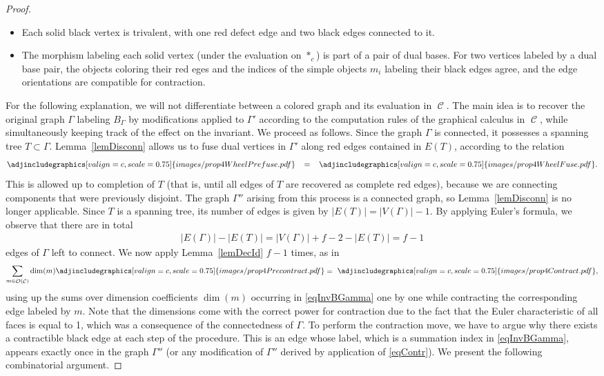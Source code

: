 \documentclass[10pt,a4paper]{amsart}
\DeclareMathOperator{\calc}{\mathcal{C}}
\DeclareMathOperator{\calo}{\mathcal{O}}
\numberwithin{equation}{section}
\theoremstyle{definition}
\begin{document}
\begin{proof}
 \begin{itemize}\itemsep=0pt
 \item Each solid black vertex is trivalent, with one red defect edge and two black edges connected to it.
 \item The morphism labeling each solid vertex (under the evaluation on $*_c$) is part of a pair of dual bases. For two vertices labeled by a dual base pair, the objects coloring their red eges and the indices of the simple objects $m_i$ labeling their black edges agree, and the edge orientations are compatible for contraction.
 \end{itemize}
 For the following explanation, we will not differentiate between a colored graph and its evaluation in $\calc$. The main idea is to recover the original graph $\Gamma$ labeling $B_{\Gamma}$ by modifications applied to $\Gamma'$ according to the computation rules of the graphical calculus in $\calc$, while simultaneously keeping track of the effect on the invariant. We proceed as follows. Since the graph $\Gamma$ is connected, it possesses a spanning tree $T \subset \Gamma$. Lemma~\ref{lemDisconn} allows us to fuse dual vertices in $\Gamma'$ along red edges contained in $E(T)$, according to the relation
 \begin{align*}
 \adjincludegraphics[valign=c, scale = 0.75]{images/prop4WheelPrefuse.pdf} \, \, \, \, \, = \, \, \, \, \,\adjincludegraphics[valign=c, scale = 0.75]{images/prop4WheelFuse.pdf}.
 \end{align*}
 This is allowed up to completion of $T$ (that is, until all edges of $T$ are recovered as complete red edges), because we are connecting components that were previously disjoint. The graph $\Gamma''$ arising from this process is a connected graph, so Lemma~\ref{lemDisconn} is no longer applicable. Since $T$ is a spanning tree, its number of edges is given by $|E(T)| = |V(\Gamma)| -1$. By applying Euler's formula, we observe that there are in total
 \begin{align}
 \label{eqCount}
 |E(\Gamma)|- |E(T)| = |V(\Gamma)| + f - 2 - |E(T)| = f-1
 \end{align}
 edges of $\Gamma$ left to connect. We now apply Lemma~\ref{lemDecId} $f-1$ times, as in
 \begin{align}
 \label{eqContr}
 \sum_{m \in \calo(\calc)} \dim(m) \adjincludegraphics[valign=c, scale = 0.75]{images/prop4Precontract.pdf} = \, \, \adjincludegraphics[valign=c, scale = 0.75]{images/prop4Contract.pdf},
 \end{align}
 using up the sums over dimension coefficients $\dim(m)$ occurring in \eqref{eqInvBGamma} one by one while contracting the corresponding edge labeled by $m$. Note that the dimensions come with the correct power for contraction due to the fact that the Euler characteristic of all faces is equal to 1, which was a consequence of the connectedness of $\Gamma$. To perform the contraction move, we have to argue why there exists a contractible black edge at each step of the procedure. This is an edge whose label, which is a summation index in \eqref{eqInvBGamma}, appears exactly once in the graph $\Gamma''$ (or any modification of $\Gamma''$ derived by application of \eqref{eqContr}). We present the following combinatorial argument.

\end{proof}
\end{document}
